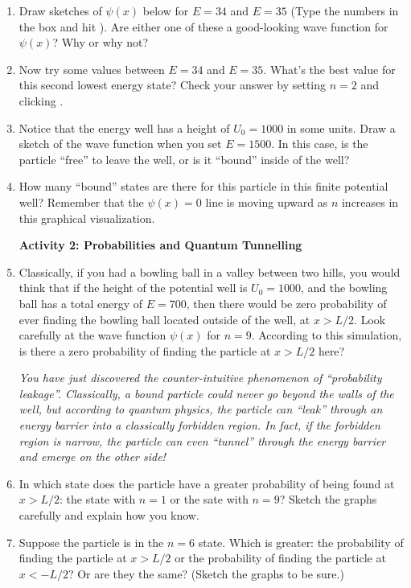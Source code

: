 \begin{enumerate}[wide]
\item Draw sketches of $\psi(x)$ below for $E = 34$ and $E = 35$ (Type the numbers in the  box and hit ). Are either one of these a good-looking wave function for $\psi(x)$? Why or why not?
\answerspace{1.5in}

\item Now try some values between $E = 34$ and $E = 35$. What's the best value for this second lowest energy state? Check your answer by setting $n = 2$ and clicking .
\answerspace{0.5in}

\item Notice that the energy well has a height of $U_0 = 1000$ in some units. Draw a sketch of the wave function when you set $E = 1500$. In this case, is the particle ``free'' to leave the well, or is it ``bound'' inside of the well?
\answerspace{0.5in}

\item How many ``bound'' states are there for this particle in this finite potential well?  Remember that the $\psi(x)=0$ line is moving upward as $n$ increases in this graphical visualization.
\answerspace{0.5in}

\textbf{Activity 2: Probabilities and Quantum Tunnelling}

\item Classically, if you had a bowling ball in a valley between two hills, you would think that if the height of the potential well is $U_0 = 1000$, and the bowling ball has a total energy of $E = 700$, then there would be zero probability of ever finding the bowling ball located outside of the well, at $x > L/2$.  Look carefully at the wave function $\psi(x)$ for $n = 9$. According to this simulation, is there a zero probability of finding the particle at $ x > L/2$ here?
\answerspace{0.8in}

\pagebreak[2]

\textit{You have just discovered the counter-intuitive phenomenon of ``probability leakage''.  Classically, a bound particle could never go beyond the walls of the well, but according to quantum physics, the particle can ``leak'' through an energy barrier into a classically forbidden region.  In fact, if the forbidden region is narrow, the particle can even ``tunnel'' through the energy barrier and emerge on the other side!}

\item In which state does the particle have a greater probability of being found at $x > L/2$: the state with $n=1$ or the sate with $n=9$?  Sketch the graphs carefully and explain how you know.
\answerspace{1.5in}

\item Suppose the particle is in the $n = 6$ state. Which is greater: the probability of finding the particle at $x > L/2$ or the probability of finding the particle at $x < -L/2$?  Or are they the same? (Sketch the graphs to be sure.)
\answerspace{1.5in}

\end{enumerate}
